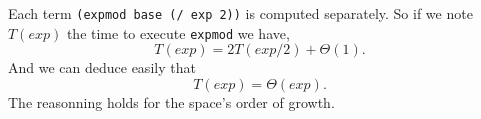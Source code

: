 \documentclass[a4paper,12pt]{article}
\begin{document}
Each term \lstinline!(expmod base (/ exp 2))! is computed separately.
So if we note $T(exp)$ the time to execute \lstinline!expmod! we have,
\[ T(exp) = 2 T(exp/2) + \Theta(1).\]
And we can deduce easily that
\[ T(exp) = \Theta(exp).\]
The reasonning holds for the space's order of growth.
\end{document}
